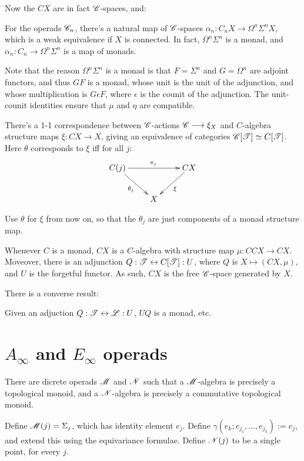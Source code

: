 \documentclass[11pt]{article}
\begin{document}
Now the $CX$ are in fact $\mathscr{C}$-spaces, and:
\begin{thm*}[2.7]
For the operads $\mathscr{C}_n$, there's a natural map of $\mathscr{C}$-spaces
$\alpha_n:C_nX\to\Omega^n\Sigma^nX$, which is a weak equivalence if $X$
is connected. In fact, $\Omega^n\Sigma^n$ is a monad, and 
$\alpha_n:C_n\to\Omega^n\Sigma^n$ is a map of monads.
\end{thm*}
\noindent
Note that the reason $\Omega^n\Sigma^n$ is a monad is that $F=\Sigma^n$
and $G=\Omega^n$ are adjoint functors, and thus $GF$ is a monad, whose unit is
the unit of the adjunction, and whose multiplication is $G\epsilon F$, where
$\epsilon$ is the counit of the adjunction. The unit-counit identities ensure
that $\mu$ and $\eta$ are compatible.
\begin{prop*}[2.8]
There's a 1-1 correspondence between $\mathscr{C}$-actions $\mathscr{C}\longrightarrow\xi_X$ and 
$C$-algebra structure maps $\xi:CX\to X$, giving an equivalence of categories 
$\mathscr{C}[\mathscr{T}]\simeq C[\mathscr{T}]$. Here $\theta$ corresponds to $\xi$ iff for all $j$:
\[\xymatrix{\ar[rd]_{\theta_j}C(j)\ar[rr]^{\pi_j}&&CX\ar[dl]^\xi\\
&X}\]
\end{prop*}
\noindent
Use $\theta$ for $\xi$ from now on, so that the $\theta_j$ are just components
of a monad structure map.
\begin{lem*}[2.9]
Whenever $C$ is a monad, $CX$ is a $C$-algebra with structure map $\mu:CCX\to CX$.
Moveover, there is an adjunction $Q:\mathscr{T}\leftrightarrow C[\mathscr{T}]:U$, where $Q$
is $X\mapsto (CX,\mu)$, and $U$ is the forgetful functor. As such, $CX$ is
the free $\mathscr{C}$-space generated by $X$.
\end{lem*}
There is a converse result:
\begin{lem*}[2.10]
Given an adjuction $Q:\mathscr{T}\leftrightarrow \mathscr{L}:U$, $UQ$ is a monad, etc.
\end{lem*}

\section{\texorpdfstring{$A_\infty$ and $E_\infty$}{A and E} operads}
There are dicrete operads $\mathscr{M}$ and $\mathscr{N}$ such that a $\mathscr{M}$-algebra is 
precisely a topological monoid, and a $\mathscr{N}$-algebra is precisely a
commutative topological monoid.

Define $\mathscr{M}(j)=\Sigma_j$, which has identity element $e_j$. Define
$\gamma(e_k;e_{j_1},\ldots,e_{j_k}):=e_{j}$, and extend this using the
equivariance formulae. Define $\mathscr{N}(j)$ to be a single point, for every $j$.
\end{document}

